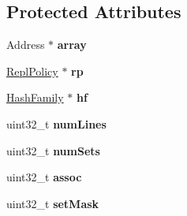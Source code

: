 \subsection*{Protected Attributes}
\begin{DoxyCompactItemize}
\item 
\hypertarget{classSetAssocArray_aaef7716d612f645395782282f27734d7}{Address $\ast$ {\bfseries array}}\label{classSetAssocArray_aaef7716d612f645395782282f27734d7}

\item 
\hypertarget{classSetAssocArray_ab2c9e51af57f6b50074ccc7f91ac8a2b}{\hyperlink{classReplPolicy}{Repl\-Policy} $\ast$ {\bfseries rp}}\label{classSetAssocArray_ab2c9e51af57f6b50074ccc7f91ac8a2b}

\item 
\hypertarget{classSetAssocArray_a3fdaff9916a2c976ea32269b7030e5aa}{\hyperlink{classHashFamily}{Hash\-Family} $\ast$ {\bfseries hf}}\label{classSetAssocArray_a3fdaff9916a2c976ea32269b7030e5aa}

\item 
\hypertarget{classSetAssocArray_a0ad0ef2f3f45f7c41813d2e16777f917}{uint32\-\_\-t {\bfseries num\-Lines}}\label{classSetAssocArray_a0ad0ef2f3f45f7c41813d2e16777f917}

\item 
\hypertarget{classSetAssocArray_a9b6e72aef33bbec18e20f90ae9a4316d}{uint32\-\_\-t {\bfseries num\-Sets}}\label{classSetAssocArray_a9b6e72aef33bbec18e20f90ae9a4316d}

\item 
\hypertarget{classSetAssocArray_a3ec1554ca492e72bd2ca456df335a68b}{uint32\-\_\-t {\bfseries assoc}}\label{classSetAssocArray_a3ec1554ca492e72bd2ca456df335a68b}

\item 
\hypertarget{classSetAssocArray_a5dfa66ea48924b742a2baf4c6d10b13f}{uint32\-\_\-t {\bfseries set\-Mask}}\label{classSetAssocArray_a5dfa66ea48924b742a2baf4c6d10b13f}

\end{DoxyCompactItemize}


